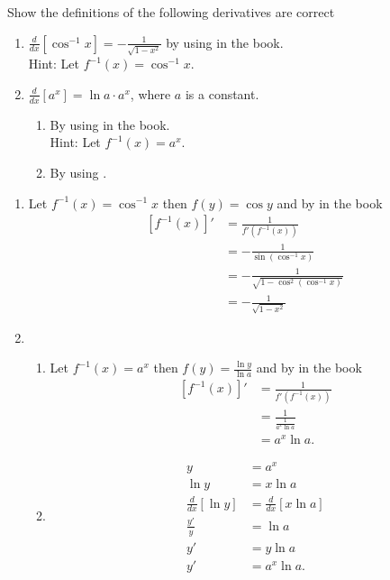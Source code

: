 \documentclass[10pt,letterpaper]{hwset}
\begin{document}
\begin{problem}[4.]
	Show the definitions of the following derivatives are correct
	\begin{enumerate}
		\item $\frac{d}{dx}\left[\cos^{-1} x\right] = -\frac{1}{\sqrt{1-x^2}}$ by
			using  in the book.\\
			Hint: Let $f^{-1}(x)=\cos^{-1} x$.
		\item $\frac{d}{dx}\left[a^x\right] = \ln a \cdot a^x$, where $a$ is a
			constant. \\ 
			\begin{enumerate}
				\item By using  in the book. \\
					Hint: Let $f^{-1}(x)=a^x$.
				\item By using .
			\end{enumerate}
	\end{enumerate}
\end{problem}

\begin{enumerate}
	\item	\begin{solution}
		Let $f^{-1}(x) = \cos^{-1} x$ then $f(y) = \cos y$ and by  in
		the book
		\begin{align*}
			\left[ f^{-1}(x) \right]' &= \frac{1}{f'(f^{-1}(x))} \\
			&= -\frac{1}{\sin (\cos^{-1} x)} \\
			&= -\frac{1}{\sqrt{1 - \cos^2 (\cos^{-1} x)}} \\
			&= -\frac{1}{\sqrt{1 - x^2}} 
		\end{align*}
	\end{solution}
	\item \begin{enumerate}
		\item \begin{solution}
			Let $f^{-1}(x) = a^x$ then $f(y) = \frac{\ln y}{\ln a}$ and by
			 in the book
			\begin{align*}
				\left[ f^{-1}(x) \right]' &= \frac{1}{f'(f^{-1}(x))} \\
				&= \frac{1}{\frac{1}{a^x \ln a}} \\
				&= a^x \ln a. 
			\end{align*}
		\end{solution}
		\item \begin{solution}
			\begin{align*}
				y &= a^x \\
				\ln y &= x \ln a \\
				\frac{d}{dx}\left[ \ln y \right] &= \frac{d}{dx}\left[ x \ln a \right] \\
				\frac{y'}{y} &= \ln a \\
				y' &= y \ln a \\
				y' &= a^x \ln a.
				\end{align*}
		\end{solution}
	\end{enumerate}
\end{enumerate}
\end{document}
